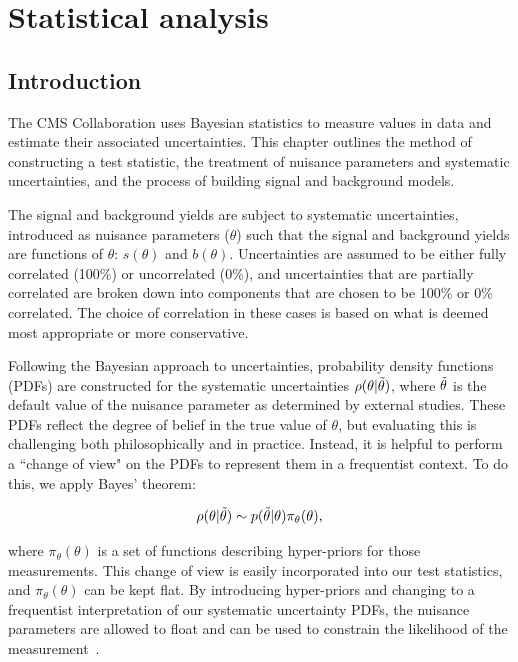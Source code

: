 \chapter{Statistical analysis}
\label{chap:stats}

\section{Introduction}

The CMS Collaboration uses Bayesian statistics to measure values in data and estimate their associated uncertainties. This chapter outlines the method of constructing a test statistic, the treatment of nuisance parameters and systematic uncertainties, and the process of building signal and background models.

The signal and background yields are subject to systematic uncertainties, introduced as nuisance parameters ($\theta$) such that the signal and background yields are functions of $\theta$: $s(\theta)$ and $b(\theta)$. Uncertainties are assumed to be either fully correlated (100\%) or uncorrelated (0\%), and uncertainties that are partially correlated are broken down into components that are chosen to be 100\% or 0\% correlated. The choice of correlation in these cases is based on what is deemed most appropriate or more conservative. 

Following the Bayesian approach to uncertainties, probability density functions (PDFs) are constructed for the systematic uncertainties $\rho(\theta|\Tilde{\theta})$, where $\Tilde{\theta}$ is the default value of the nuisance parameter as determined by external studies. These PDFs reflect the degree of belief in the true value of $\theta$, but evaluating this is challenging both philosophically and in practice. Instead, it is helpful to perform a ``change of view" on the PDFs to represent them in a frequentist context. To do this, we apply Bayes' theorem:

\begin{equation}
    \rho(\theta | \Tilde{\theta}) \sim p(\Tilde{\theta} | \theta) \pi_{\theta}(\theta),
\end{equation}

\noindent where $\pi_{\theta}(\theta)$ is a set of functions describing hyper-priors for those measurements. This change of view is easily incorporated into our test statistics, and $\pi_{\theta}(\theta)$ can be kept flat. By introducing hyper-priors and changing to a frequentist interpretation of our systematic uncertainty PDFs, the nuisance parameters are allowed to float and can be used to constrain the likelihood of the measurement~\cite{feldman_cousins}. 

